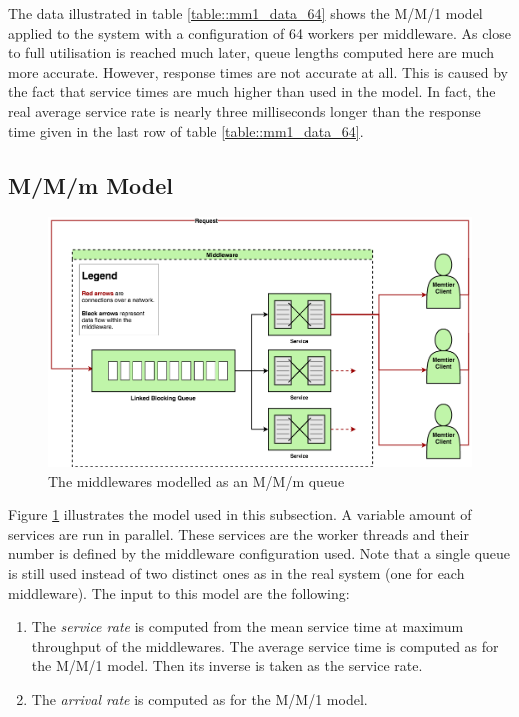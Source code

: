 \documentclass[11pt,a4paper]{article}
\begin{document}
The data illustrated in table \ref{table::mm1_data_64} shows the M/M/1 model applied to the system with a configuration of 64 workers per middleware. As close to full utilisation is reached much later, queue lengths computed here are much more accurate. However, response times are not accurate at all. This is caused by the fact that service times are much higher than used in the model. In fact, the real average service rate is nearly three milliseconds longer than the response time given in the last row of table \ref{table::mm1_data_64}.

\subsection{M/M/m Model}

\begin{figure}[!h]
    \centering
    \includegraphics[width=\textwidth]{processing/graphics/mmn_queue.png}
    \caption{The middlewares modelled as an M/M/m queue}
    \label{png::mmn_queue}
\end{figure}

Figure \ref{png::mmn_queue} illustrates the model used in this subsection. A variable amount of services are run in parallel. These services are the worker threads and their number is defined by the middleware configuration used. Note that a single queue is still used instead of two distinct ones as in the real system (one for each middleware). The input to this model are the following:
\begin{enumerate}
    \item The \textit{service rate} is computed from the mean service time at maximum throughput of the middlewares. The average service time is computed as for the M/M/1 model. Then its inverse is taken as the service rate.
    \item The \textit{arrival rate} is computed as for the M/M/1 model.
\end{enumerate}
\end{document}
